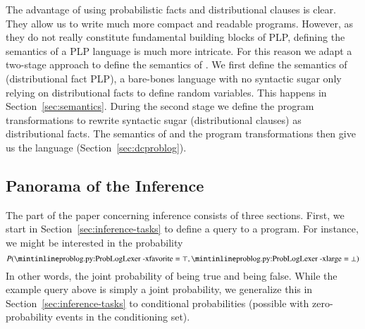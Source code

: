 The advantage of using probabilistic facts and distributional clauses is clear. They allow us to write much more compact and readable programs. However, as they do not really constitute fundamental building blocks of PLP, defining the semantics of a PLP language is much more intricate. For this reason we adapt a two-stage approach to define the semantics of \dcproblogsty. We first define the semantics of \dfplpsty (distributional fact PLP), a bare-bones language with no syntactic sugar only relying on distributional facts to define random variables. This happens in Section~\ref{sec:semantics}. During the second stage we define the program transformations to rewrite syntactic sugar (\eg distributional clauses) as distributional facts. The semantics of \dfplpsty and the program transformations then give us the \dcproblogsty language (\cf Section~\ref{sec:dcproblog}).








\subsection{Panorama of the Inference}
\label{sec:panorama_inference}

The part of the paper concerning inference consists of three sections. First, we start in Section~\ref{sec:inference-tasks} to define a query to a \dcproblogsty program.
For instance, we might be interested in the probability
$$
P(\mathprobloginline{favorite}=\top, \mathprobloginline{large}=\bot)
$$
In other words, the joint probability of  being true and  being false. While the example query above is simply a joint probability, we generalize this in Section~\ref{sec:inference-tasks} to conditional probabilities (possible with zero-probability events in the conditioning set).

